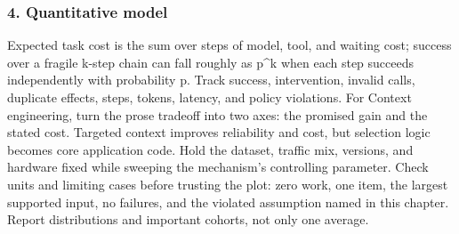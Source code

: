 \subsubsection*{4. Quantitative model}
Expected task cost is the sum over steps of model, tool, and waiting cost; success over a fragile k-step chain can fall roughly as p\textasciicircum{}k when each step succeeds independently with probability p. Track success, intervention, invalid calls, duplicate effects, steps, tokens, latency, and policy violations.
For Context engineering, turn the prose tradeoff into two axes: the promised gain and the stated cost. Targeted context improves reliability and cost, but selection logic becomes core application code. Hold the dataset, traffic mix, versions, and hardware fixed while sweeping the mechanism's controlling parameter.
Check units and limiting cases before trusting the plot: zero work, one item, the largest supported input, no failures, and the violated assumption named in this chapter. Report distributions and important cohorts, not only one average.
